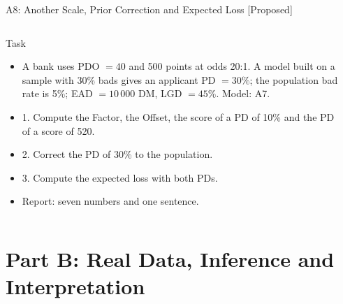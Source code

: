 \begin{frame}{A8: Another Scale, Prior Correction and Expected Loss [Proposed]}
\propsub
\itemsize{\scriptsize}
\begin{columns}[T]
\begin{column}{\taskw}
\begin{block}{Task}
\begin{itemize}
    \item A bank uses PDO $= 40$ and 500 points at odds 20:1. A model built on a sample with 30\% bads gives an applicant PD $= 30\%$; the population bad rate is 5\%; EAD $= 10\,000$ DM, LGD $= 45\%$. Model: A7.
    \item 1. Compute the Factor, the Offset, the score of a PD of 10\% and the PD of a score of 520.
    \item 2. Correct the PD of 30\% to the population.
    \item 3. Compute the expected loss with both PDs.
    \item Report: seven numbers and one sentence.
\end{itemize}
\end{block}
\end{column}
\begin{column}{\solw}
\end{column}
\end{columns}
\end{frame}


\section{Part B: Real Data, Inference and Interpretation}

